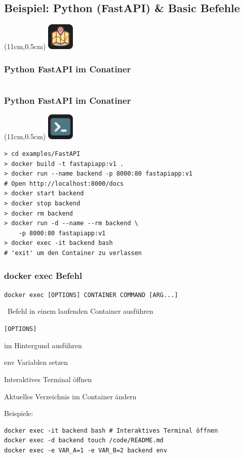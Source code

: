 \documentclass[22pt]{beamer}
\newcommand{\code}[1]{\colorbox{gray!10}{\texttt{#1}}}
\newcommand{\desclabel}[1]{\textcolor{cyan}{#1}}
\newcommand{\codeTour}{
    \begin{textblock*}{1.3cm}(11cm,0.5cm) %
    \includegraphics[width=1.3cm]{Bilder/CodeTour.png}
    \end{textblock*}
}
\newcommand{\terminal}{
    \begin{textblock*}{1.3cm}(11cm,0.5cm) %
    \includegraphics[width=1.3cm]{Bilder/terminal2.png}
    \end{textblock*}
}
\begin{document}
\subsection{Beispiel: Python (FastAPI) \& Basic Befehle}
\begin{frame}[fragile]
    \codeTour
    \frametitle{Python FastAPI im Conatiner}

    \inputminted[fontsize=\footnotesize, frame=lines]{dockerfile}{../examples/FastAPI/Dockerfile}
\end{frame}

\begin{frame}[fragile]
    \frametitle{Python FastAPI im Conatiner}
    \terminal
\begin{verbatim}
> cd examples/FastAPI
> docker build -t fastapiapp:v1 .
> docker run --name backend -p 8000:80 fastapiapp:v1
# Open http://localhost:8000/docs
> docker start backend
> docker stop backend
> docker rm backend
> docker run -d --name --rm backend \
    -p 8000:80 fastapiapp:v1
> docker exec -it backend bash
# 'exit' um den Container zu verlassen
\end{verbatim}
\end{frame}

\begin{frame}[fragile]
    \frametitle{docker exec Befehl}
    \code{docker exec [OPTIONS] CONTAINER COMMAND [ARG...]}

    \-  \ Befehl in einem laufenden Container ausführen\vspace{5pt}

    \code{[OPTIONS]}
    \begin{description}[labelindent=0.5cm, style=unboxed, labelwidth=\widthof{bla}, leftmargin=!]
        \item[\desclabel{-d}] im Hintergund ausführen
        \item[\desclabel{-e}] env Variablen setzen
        \item[\desclabel{-it}] Interaktives Terminal öffnen
        \item[\desclabel{-w, -\,-workdir string}] Aktuelles Verzeichnis im Container ändern
        \item[...] 
    \end{description}

    Beispiele:
\begin{verbatim}
docker exec -it backend bash # Interaktives Terminal öffnen
docker exec -d backend touch /code/README.md
docker exec -e VAR_A=1 -e VAR_B=2 backend env
\end{verbatim}
    
\end{frame}
\end{document}
